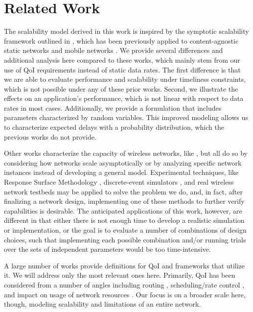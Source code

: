 \section{Related Work}
\label{sec:related_work}

The scalability model derived in this work is inspired by the symptotic scalability framework outlined in \cite{symptotics_journal}, which has been previously applied to content-agnostic static networks \cite{symptotics_framework_scalability} and mobile networks \cite{scal_analysis_mobility}. {\color{blue}We provide several differences and additional analysis here compared to these works, which mainly stem from our use of QoI requirements instead of static data rates. The first difference is that we are able to evaluate performance and scalability under timeliness constraints, which is not possible under any of these prior works. Second, we illustrate the effects on an application's performance, which is not linear with respect to data rates in most cases. Additionally, we provide a formulation that includes parameters characterized by random variables. This improved modeling allows us to characterize expected delays with a probability distribution, which the previous works do not provide.}

Other works characterize the capacity of wireless networks, like \cite{li_capacity, gupta2000capacity}, but all do so by considering how networks scale asymptotically or by analyzing specific network instances instead of developing a general model. {\color{blue}Experimental techniques, like Response Surface Methodology \cite{khuri2010response}, discrete-event simulators \cite{ns3}, and real wireless network testbeds \cite{iot_lab_exp_platform, wsn_testbed, wisebed} may be applied to solve the problem we do, and, in fact, after finalizing a network design, implementing one of these methods to further verify capabilities is desirable. The anticipated applications of this work, however, are different in that either there is not enough time to develop a realistic simulation or implementation, or the goal is to evaluate a number of combinations of design choices, such that implementing each possible combination and/or running trials over the sets of independent parameters would be too time-intensive.}

A large number of works provide definitions for QoI and frameworks that utilize it.  We will address only the most relevant ones here.  Primarily, QoI has been considered from a number of angles including routing \cite{quality_aware_routing_tan}, scheduling/rate control \cite{toward_qoi_rate_control,explor_vs_exploit}, and impact on usage of network resources \cite{qoi_aware_mobile_apps}. Our focus is on a broader scale here, though, modeling scalability and limitations of an entire network.  

